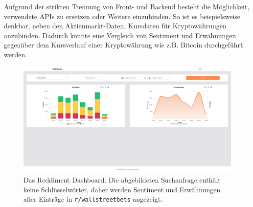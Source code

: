 \documentclass[a4paper, 10pt, conference]{IEEEtran}
\begin{document}
Aufgrund der strikten Trennung von Front- und Backend  besteht die Möglichkeit, verwendete APIs zu ersetzen oder Weitere einzubinden. So ist es beispielsweise denkbar, neben den Aktienmarkt-Daten, Kursdaten für Kryptowährungen anzubinden. Dadurch könnte eine Vergleich von Sentiment und Erwähnungen gegenüber dem Kursverlauf einer Kryptowährung wie z.B. Bitcoin durchgeführt werden.

\newpage

\printbibliography

\newpage

\begin{figure}
  \includegraphics[page=1, width=\columnwidth]{Reddiment_Overview}
  \caption{Das Reddiment Dashboard. Die abgebildeten Suchanfrage enthält keine Schlüsselwörter, daher werden Sentiment und Erwähnungen aller Einträge in \texttt{r/wallstreetbets} angezeigt.}
  \label{fig:extended_layers}
  \end{figure}
\end{document}
